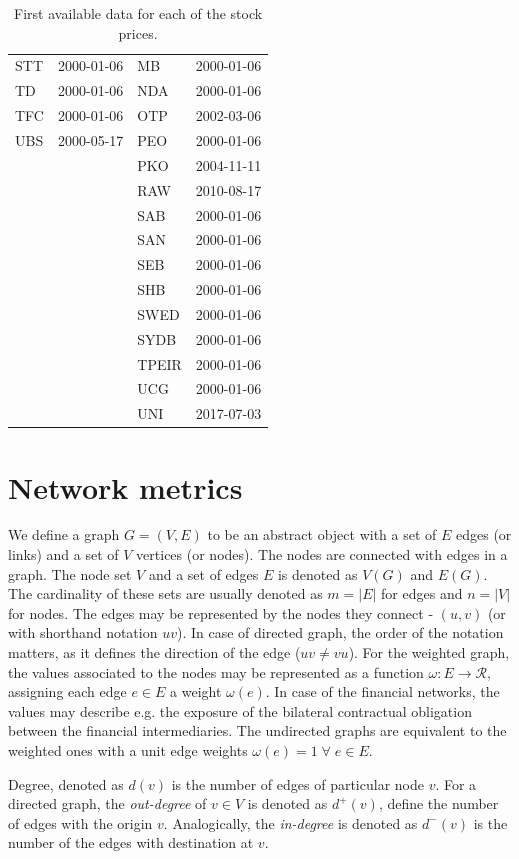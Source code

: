 \documentclass[12pt]{article}
\begin{document}
\begin{table}[!htbp]
\begin{tabular}{l|l|l|l}
		STT & 2000-01-06 & MB & 2000-01-06 \\ 
		TD & 2000-01-06 & NDA & 2000-01-06 \\ 
		TFC & 2000-01-06 & OTP & 2002-03-06 \\ 
		UBS & 2000-05-17 & PEO & 2000-01-06 \\ 
		&  & PKO & 2004-11-11 \\ 
		&  & RAW & 2010-08-17 \\ 
		&  & SAB & 2000-01-06 \\ 
		&  & SAN & 2000-01-06 \\ 
		&  & SEB & 2000-01-06 \\ 
		&  & SHB & 2000-01-06 \\ 
		&  & SWED & 2000-01-06 \\ 
		&  & SYDB & 2000-01-06 \\ 
		&  & TPEIR & 2000-01-06 \\ 
		&  & UCG & 2000-01-06 \\ 
		&  & UNI & 2017-07-03 
	\end{tabular}
		\caption{First available data for each of the stock prices. }
	\label{table:ipo}
\end{table}

\section{Network metrics}\label{appendix:network_metrics}

We define a graph $G = (V, E)$ to be an abstract object with a set of $E$ edges (or links) and a set of $V$ vertices (or nodes). The nodes are connected with edges in a graph. The node set $V$ and a set of edges $E$ is denoted as $V(G)$ and $E(G)$. The cardinality of these sets are usually denoted as $m = |E|$ for edges and $n = |V|$ for nodes. The edges may be represented by the nodes they connect - $(u, v)$ (or with shorthand notation $uv$). In case of directed graph, the order of the notation matters, as it defines the direction of the edge ($uv \neq vu$). For the weighted graph, the values associated to the nodes may be represented as a function $\omega : E \rightarrow \mathcal{R}$, assigning each edge $e \in E$ a weight $\omega(e)$. In case of the financial networks, the values may describe e.g. the exposure of the bilateral contractual obligation between the financial intermediaries. The undirected graphs are equivalent to the weighted ones with a unit edge weights $\omega(e) = 1 \; \forall \; e \in E$.

Degree, denoted as $d(v)$ is the number of edges of particular node $v$. For a directed graph, the \textit{out-degree} of $v \in V$ is denoted as $d^{+}(v)$, define the number of edges with the origin $v$. Analogically, the \textit{in-degree} is denoted as $d^{-}(v)$ is the number of the edges with destination at $v$.
\end{document}
